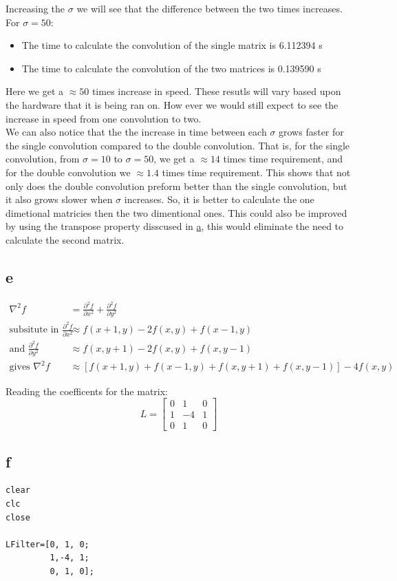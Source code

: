 \documentclass[11pt]{article}
\begin{document}
Increasing the \(\sigma\) we will see that the difference between the two times increases. For \(\sigma=50\):
\begin{itemize}
\item The time to calculate the convolution of the single matrix is 6.112394 s
\item The time to calculate the convolution of the two matrices is 0.139590 s
\end{itemize}
Here we get a \(\approx 50\) times increase in speed. These resutls will vary based upon the hardware that it is being ran on. How ever we would still expect to see the increase in speed from one convolution to two.\\
We can also notice that the the increase in time between each \(\sigma\) grows faster for the single convolution compared to the double convolution. That is, for the single convolution, from \(\sigma=10\) to \(\sigma=50\), we get a \(\approx 14\) times time requirement, and for the double convolution we \(\approx 1.4\) times time requirement. This shows that not only does the double convolution preform better than the single convolution, but it also grows slower when \(\sigma\) increases. So, it is better to calculate the one dimetional matricies then the two dimentional ones. This could also be improved by using the transpose property disscused in \hyperref[sec:org47fb13f]{a}, this would eliminate the need to calculate the second matrix.
\subsection{e}
\label{sec:org0788ead}
\begin{align*}
\nabla^{2}f &= \frac{\partial^2 f}{\partial x^2}+ \frac{\partial^2 f}{\partial y^2} \\
\textrm{subsitute in } \frac{\partial^2 f}{\partial x^2} &\approx f(x+1,y)-2f(x,y)+f(x-1,y) \\
\textrm{and } \frac{\partial^2 f}{\partial y^2} &\approx f(x,y+1)-2f(x,y)+f(x,y-1) \\
\textrm{gives }\nabla^{2}f & \approx \left[ f(x+1,y) + f(x-1,y) + f(x,y+1) + f(x,y-1)\right] - 4f(x,y)
\end{align*}

Reading the coefficents for the matrix:
\[L=\begin{bmatrix}
0 & 1  & 0 \\
1 & -4 & 1 \\
0 & 1  & 0
\end{bmatrix}\]
\subsection{f}
\label{sec:org6455a48}
\begin{verbatim}
clear
clc
close

LFilter=[0, 1, 0;
         1,-4, 1;
         0, 1, 0];

\end{verbatim}
\end{document}
